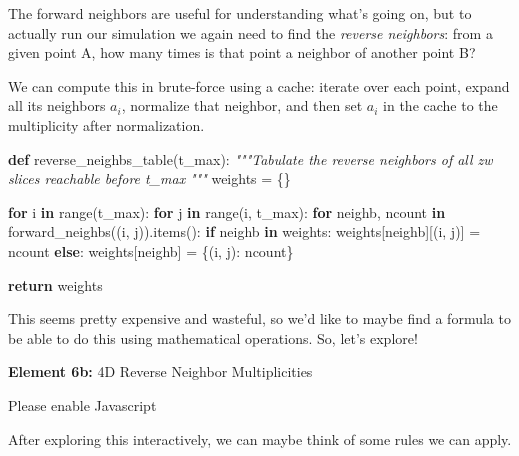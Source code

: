 \documentclass[]{article}
\newenvironment{Shaded}{}{}
\newcommand{\BuiltInTok}[1]{#1}
\newcommand{\CommentTok}[1]{\textcolor[rgb]{0.38,0.63,0.69}{\textit{#1}}}
\newcommand{\ControlFlowTok}[1]{\textcolor[rgb]{0.00,0.44,0.13}{\textbf{#1}}}
\newcommand{\KeywordTok}[1]{\textcolor[rgb]{0.00,0.44,0.13}{\textbf{#1}}}
\newcommand{\NormalTok}[1]{#1}
\newcommand{\OperatorTok}[1]{\textcolor[rgb]{0.40,0.40,0.40}{#1}}
\begin{document}
The forward neighbors are useful for understanding what's going on, but to
actually run our simulation we again need to find the \emph{reverse neighbors}:
from a given point A, how many times is that point a neighbor of another point
B?

We can compute this in brute-force using a cache: iterate over each point,
expand all its neighbors \(a_i\), normalize that neighbor, and then set \(a_i\)
in the cache to the multiplicity after normalization.

\begin{Shaded}
\begin{Highlighting}[]
\KeywordTok{def}\NormalTok{ reverse\_neighbs\_table(t\_max):}
    \CommentTok{"""Tabulate the reverse neighbors of all zw slices reachable before t\_max}
\CommentTok{    """}
\NormalTok{    weights }\OperatorTok{=}\NormalTok{ \{\}}

    \ControlFlowTok{for}\NormalTok{ i }\KeywordTok{in} \BuiltInTok{range}\NormalTok{(t\_max):}
        \ControlFlowTok{for}\NormalTok{ j }\KeywordTok{in} \BuiltInTok{range}\NormalTok{(i, t\_max):}
            \ControlFlowTok{for}\NormalTok{ neighb, ncount }\KeywordTok{in}\NormalTok{ forward\_neighbs((i, j)).items():}
                \ControlFlowTok{if}\NormalTok{ neighb }\KeywordTok{in}\NormalTok{ weights:}
\NormalTok{                    weights[neighb][(i, j)] }\OperatorTok{=}\NormalTok{ ncount}
                \ControlFlowTok{else}\NormalTok{:}
\NormalTok{                    weights[neighb] }\OperatorTok{=}\NormalTok{ \{(i, j): ncount\}}

    \ControlFlowTok{return}\NormalTok{ weights}
\end{Highlighting}
\end{Shaded}

This seems pretty expensive and wasteful, so we'd like to maybe find a formula
to be able to do this using mathematical operations. So, let's explore!

\leavevmode\hypertarget{golSyms4DReverse}{}%
\textbf{Element 6b:} 4D Reverse Neighbor Multiplicities

\leavevmode\hypertarget{golSyms4DReverseCont}{}%
Please enable Javascript

After exploring this interactively, we can maybe think of some rules we can
apply.
\end{document}
